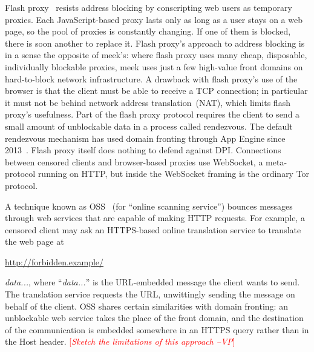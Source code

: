 \documentclass{sig-alternate}
\newcommand{\meek}{meek\xspace}
\def\urll#1{\begin{NoHyper}\url{#1}\end{NoHyper}}
\newcommand{\note}[1]{{\textcolor{red}{[\textit{#1}]}}}
\newcommand{\vp}[1]{\note{#1 --VP}}
\begin{document}
Flash proxy~\cite{flashproxy} resists address blocking by
conscripting web users as temporary proxies.
Each JavaScript-based proxy lasts only as long as a
user stays on a web page, so the pool of proxies is constantly changing.
If one of them is blocked, there is soon another to replace it.
Flash proxy's approach to address blocking is in a sense
the opposite of \meek's:
where flash proxy uses many cheap, disposable, individually blockable proxies,
\meek uses just a few high-value front domains on hard-to-block network infrastructure.
A drawback with flash proxy's use of the browser is that
the client must be able to receive a TCP connection; in particular it
must not be behind network address translation~(NAT), which limits flash proxy's usefulness.
Part of the flash proxy protocol requires the client to send
a small amount of unblockable data in a process called rendezvous.
The default rendezvous mechanism has used domain fronting through App Engine since 2013~\cite{flashproxy-reg-appspot}.
Flash proxy itself does nothing to defend against DPI.
Connections between censored clients and browser-based proxies use
WebSocket, a meta-protocol running on HTTP,
but inside the WebSocket framing is the ordinary Tor protocol.

A technique known as OSS~\cite{oss} (for
``online scanning service'') bounces messages
through web services that are capable of making HTTP requests.
For example, a censored client may ask an HTTPS-based online translation service to
translate the web page at \urll{http://forbidden.example/}\textsl{data...},
where ``\textsl{data...}'' is the URL-embedded message the client wants to send.
The translation service requests the URL,
unwittingly sending the message on behalf of the client.
OSS shares certain similarities with domain fronting:
an unblockable web service takes the place of the front domain,
and the destination of the communication is embedded somewhere in an HTTPS query
rather than in the Host header.
\vp{Sketch the limitations of this approach}
\end{document}
